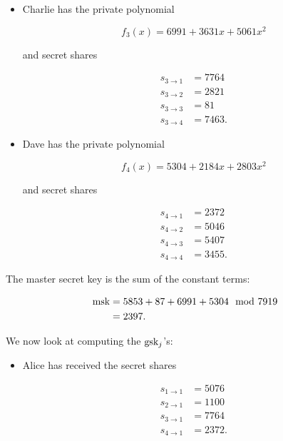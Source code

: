 \begin{example}
\begin{itemize}
\item Charlie has the private polynomial

\begin{equation}
    f_{3}(x) = 6991 + 3631x + 5061x^{2}
\end{equation}

and secret shares

\begin{align}
    s_{3\to 1} &= 7764 \nonumber\\
    s_{3\to 2} &= 2821 \nonumber\\
    s_{3\to 3} &=   81 \nonumber\\
    s_{3\to 4} &= 7463.
\end{align}

\item Dave has the private polynomial

\begin{equation}
    f_{4}(x) = 5304 + 2184x + 2803x^{2}
\end{equation}

and secret shares

\begin{align}
    s_{4\to 1} &= 2372 \nonumber\\
    s_{4\to 2} &= 5046 \nonumber\\
    s_{4\to 3} &= 5407 \nonumber\\
    s_{4\to 4} &= 3455.
\end{align}
\end{itemize}

The master secret key is the sum of the constant terms:

\begin{align}
    \textrm{msk}{} &= 5853 + 87 + 6991 + 5304 \mod 7919 \nonumber\\
        &= 2397.
\end{align}

We now look at computing the $\textrm{gsk}{}_{j}$'s:

\begin{itemize}
\item Alice has received the secret shares

\begin{align}
    s_{1\to 1} &= 5076 \nonumber\\
    s_{2\to 1} &= 1100 \nonumber\\
    s_{3\to 1} &= 7764 \nonumber\\
    s_{4\to 1} &= 2372.
\end{align}


\end{itemize}
\end{example}
